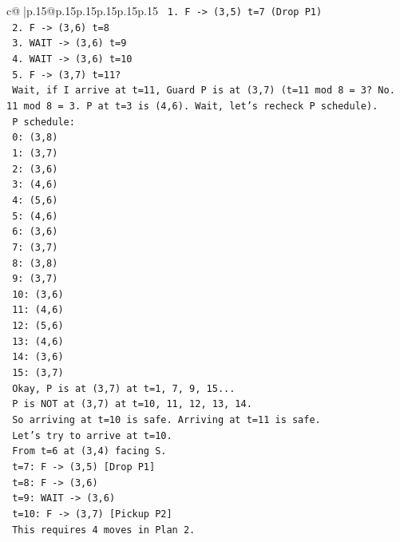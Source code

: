 \documentclass{article}
\begin{document}
{\begin{supertabular}{c@{$\;$}|p{.15\linewidth}@{}p{.15\linewidth}p{.15\linewidth}p{.15\linewidth}p{.15\linewidth}p{.15\linewidth}}
{{{\texttt{    1. F {-}> (3,5) t=7 (Drop P1)} \\
\texttt{    2. F {-}> (3,6) t=8} \\
\texttt{    3. WAIT {-}> (3,6) t=9} \\
\texttt{    4. WAIT {-}> (3,6) t=10} \\
\texttt{    5. F {-}> (3,7) t=11?} \\
\texttt{       Wait, if I arrive at t=11, Guard P is at (3,7) (t=11 mod 8 = 3? No. 11 mod 8 = 3. P at t=3 is (4,6). Wait, let's recheck P schedule).} \\
\texttt{       P schedule:} \\
\texttt{       0: (3,8)} \\
\texttt{       1: (3,7)} \\
\texttt{       2: (3,6)} \\
\texttt{       3: (4,6)} \\
\texttt{       4: (5,6)} \\
\texttt{       5: (4,6)} \\
\texttt{       6: (3,6)} \\
\texttt{       7: (3,7)} \\
\texttt{       8: (3,8)} \\
\texttt{       9: (3,7)} \\
\texttt{       10: (3,6)} \\
\texttt{       11: (4,6)} \\
\texttt{       12: (5,6)} \\
\texttt{       13: (4,6)} \\
\texttt{       14: (3,6)} \\
\texttt{       15: (3,7)} \\
\texttt{       Okay, P is at (3,7) at t=1, 7, 9, 15...} \\
\texttt{       P is NOT at (3,7) at t=10, 11, 12, 13, 14.} \\
\texttt{       So arriving at t=10 is safe. Arriving at t=11 is safe.} \\
\texttt{       Let's try to arrive at t=10.} \\
\texttt{       From t=6 at (3,4) facing S.} \\
\texttt{       t=7: F {-}> (3,5) {[}Drop P1{]}} \\
\texttt{       t=8: F {-}> (3,6)} \\
\texttt{       t=9: WAIT {-}> (3,6)} \\
\texttt{       t=10: F {-}> (3,7) {[}Pickup P2{]}} \\
\texttt{       This requires 4 moves in Plan 2.} \\
}}}
\end{supertabular}}
\end{document}
